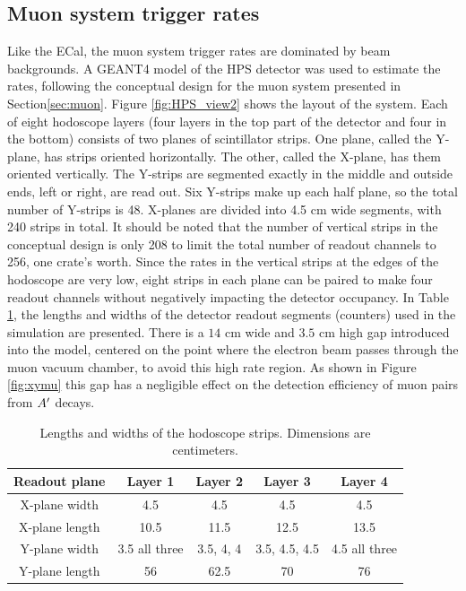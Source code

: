 \subsection{Muon system trigger rates}
\label{sec:muontrigg}

Like the ECal, the muon system trigger rates are dominated by beam backgrounds.  
A GEANT4 model of the HPS detector was used to estimate the rates, following the conceptual design for the muon system presented in 
Section\ref{sec:muon}. Figure \ref{fig:HPS_view2} shows the layout of the system. Each of eight hodoscope layers (four layers in 
the top part of the detector and four in the bottom) consists of two planes of scintillator strips. One plane, called the Y-plane, has strips 
oriented horizontally. The other, called the X-plane, has them oriented vertically. The Y-strips are segmented exactly in the middle
and outside ends, left or right, are read out. 
Six Y-strips make up each half plane, so the total number of Y-strips is 48. 
X-planes are divided into 4.5 cm wide segments, with 240 strips in total. It should be noted that the number of vertical strips 
in the conceptual design is only 208 to limit the total number of readout channels to 256, one crate's worth. Since the rates in the 
vertical strips at the edges of the hodoscope are very low, eight strips in each 
plane can be paired to make four readout channels without negatively impacting the detector occupancy. In Table \ref{tb:muonstrp}, 
the lengths and widths of the detector readout segments (counters) used in the simulation are presented. There is a $14$ cm wide 
and $3.5$ cm high gap 
introduced into the model, centered on the point where the electron beam passes through the muon vacuum chamber, to avoid this high rate region.
As shown in Figure \ref{fig:xymu} 
this gap has a negligible effect on the detection efficiency of muon pairs from $A^\prime$ decays. 

\begin{table}[htdp]
\caption{Lengths and widths of the hodoscope strips. Dimensions are centimeters.}
\begin{center}
\begin{tabular}{|c|c|c|c|c|}
\hline\hline
Readout plane& Layer 1&Layer 2&Layer 3& Layer 4 \\
\hline
X-plane width& 4.5& 4.5 & 4.5 & 4.5  \\
X-plane length&10.5&11.5&12.5&13.5\\
\hline
Y-plane width& 3.5 all three&3.5, 4, 4  & 3.5, 4.5, 4.5 & 4.5 all three\\
Y-plane length&56&62.5&70&76\\
\hline\hline
\end{tabular}
\end{center}
\label{tb:muonstrp}
\end{table}%

